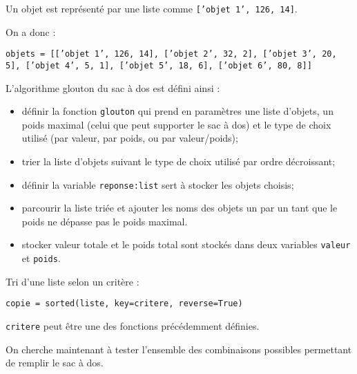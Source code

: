 Un objet est représenté par une liste comme \texttt{['objet 1', 126, 14]}.

On a donc : 
\begin{lstlisting}	
objets = [[’objet 1’, 126, 14], [’objet 2’, 32, 2], [’objet 3’, 20, 5], [’objet 4’, 5, 1], [’objet 5’, 18, 6], [’objet 6’, 80, 8]]
\end{lstlisting}




L'algorithme glouton du sac à dos est défini ainsi : 
\begin{itemize}
\item définir la fonction \texttt{glouton} qui prend en paramètres une liste d’objets, un poids maximal (celui que peut supporter le sac à dos) et le type de choix utilisé (par valeur, par poids, ou par valeur/poids);
\item trier la liste d'objets suivant le type de choix utilisé par ordre décroissant;
\item définir la variable \texttt{reponse:list} sert à stocker les objets choisis;
\item parcourir la liste triée et ajouter les noms des objets un par un tant que le poids ne dépasse pas le poids maximal. 
\item stocker valeur totale et le poids total sont stockés dans deux variables \texttt{valeur} et \texttt{poids}.
\end{itemize}

\begin{rem}
Tri d'une liste selon un critère : 
\begin{lstlisting}
copie = sorted(liste, key=critere, reverse=True)
\end{lstlisting}
\texttt{critere} peut être une des fonctions précédemment définies.
\end{rem}




On cherche maintenant à tester l'ensemble des combinaisons possibles permettant de remplir le sac à dos. 


